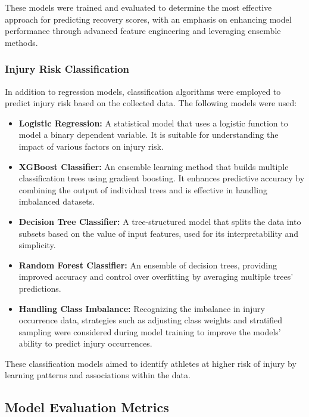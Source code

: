\documentclass[manuscript,acmsmall,review,screen,authorversion=true]{acmart}
\begin{document}
These models were trained and evaluated to determine the most effective approach for predicting recovery scores, with an emphasis on enhancing model performance through advanced feature engineering and leveraging ensemble methods.

\subsubsection{Injury Risk Classification}

In addition to regression models, classification algorithms were employed to predict injury risk based on the collected data. The following models were used:

\begin{itemize}
    \item \textbf{Logistic Regression:} A statistical model that uses a logistic function to model a binary dependent variable. It is suitable for understanding the impact of various factors on injury risk.

    \item \textbf{XGBoost Classifier:} An ensemble learning method that builds multiple classification trees using gradient boosting. It enhances predictive accuracy by combining the output of individual trees and is effective in handling imbalanced datasets.

    \item \textbf{Decision Tree Classifier:} A tree-structured model that splits the data into subsets based on the value of input features, used for its interpretability and simplicity.

    \item \textbf{Random Forest Classifier:} An ensemble of decision trees, providing improved accuracy and control over overfitting by averaging multiple trees' predictions.

    \item \textbf{Handling Class Imbalance:} Recognizing the imbalance in injury occurrence data, strategies such as adjusting class weights and stratified sampling were considered during model training to improve the models' ability to predict injury occurrences.
\end{itemize}

These classification models aimed to identify athletes at higher risk of injury by learning patterns and associations within the data.

\subsection{Model Evaluation Metrics}
\end{document}
